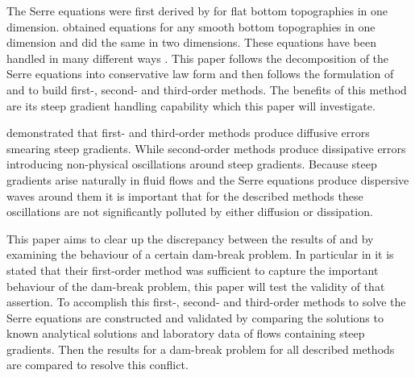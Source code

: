 \documentclass[SingleSpace,12pt,Proceedings]{Serre_ASCE}
\begin{document}
The Serre equations were first derived by  for flat bottom topographies in one dimension.  obtained equations for any smooth bottom topographies in one dimension and  did the same in two dimensions. These equations have been handled in many different ways \cite{Dutykh-2014-315,Bonneton-etal-2011-1479,Antunes-do-Carmo-etal-1993-725,Chazel-etal-2011-105,Barthelemy-2006-51-1217,Barthelemy-2007-53-1423,Clamond-2011-315}. This paper follows the decomposition of the Serre equations into conservative law form \cite{Hank-etal-2010-2034,Guyenne-etal-2014-169} and then follows the formulation of  and  to build first-, second- and third-order methods. The benefits of this method are its steep gradient handling capability which this paper will investigate.

 demonstrated that first- and third-order methods produce diffusive errors smearing steep gradients. While second-order methods produce dissipative errors introducing non-physical oscillations around steep gradients. Because steep gradients arise naturally in fluid flows and the Serre equations produce dispersive waves around them \cite{El-etal-2006} it is important that for the described methods these oscillations are not significantly polluted by either diffusion or dissipation.

This paper aims to clear up the discrepancy between the results of  and  by examining the behaviour of a certain dam-break problem. In particular in  it is stated that their first-order method was sufficient to capture the important behaviour of the dam-break problem, this paper will test the validity of that assertion. To accomplish this first-, second- and third-order methods to solve the Serre equations are constructed and validated by comparing the solutions to known analytical solutions and laboratory data of flows containing steep gradients. Then the results for a dam-break problem for all described methods are compared to resolve this conflict. 

\end{document}
